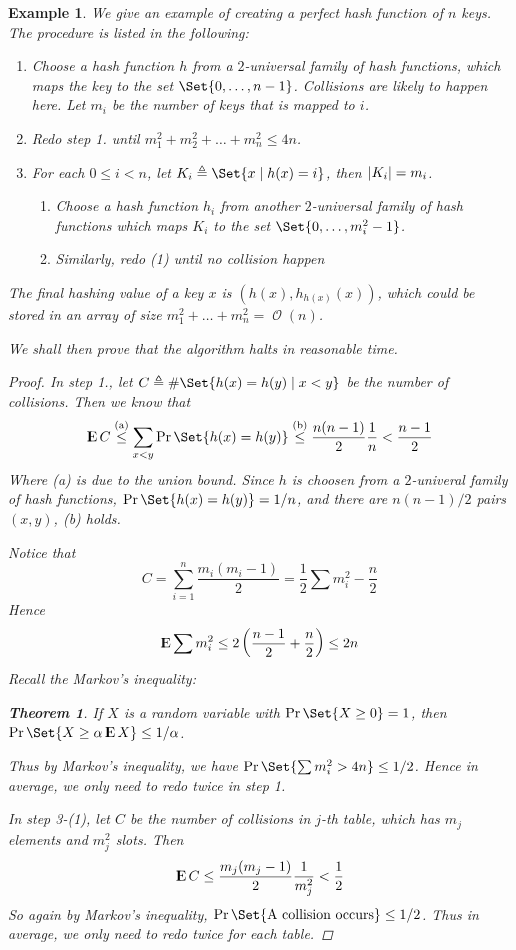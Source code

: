 \documentclass[12pt, a4paper]{article}
\DeclarePairedDelimiter{\abs}{\lvert}{\rvert}
\newcommand{\ord}{\operatorname{\mathcal{O}}}
\newcommand{\defeq}{\triangleq}
\DeclareMathOperator{\Expect}{{\rm I\kern-.3em E}}
\newtheorem{theorem}{Theorem}
\theoremstyle{mystyle} %
\newtheorem{example}{Example}
\begin{document}
\begin{example}
  We give an example of creating a perfect hash function of $n$ keys.
  The procedure is listed in the following:
  \begin{enumerate}
    \item Choose a hash function $h$ from a $2$-universal family of hash functions,
      which maps the key to the set $\Set{0, \dots, n-1}$. Collisions are
      likely to happen here. Let $m_i$ be the number of keys that is mapped to $i$.
    \item Redo step 1. until $m_1^2 + m_2^2 + \dots + m_n^2 \leq 4n$.
    \item For each $0 \leq i < n$, let $K_i \defeq \Set{ x \mid h(x) = i }$, then $\abs{K_i} = m_i$.
      \begin{enumerate}[label=(\arabic*)]
        \item Choose a hash function $h_i$ from another $2$-universal family of hash functions
          which maps $K_i$ to the set $\Set{0, \dots, m_i^2-1}$.
        \item Similarly, redo (1) until no collision happen
      \end{enumerate}
  \end{enumerate}

  The final hashing value of a key $x$ is $(h(x), h_{h(x)}(x))$, which
  could be stored in an array of size $m_1^2 + \dots + m_n^2 = \ord(n)$.

  We shall then prove that the algorithm halts in reasonable time.
  \begin{proof}
    In step 1., let $C \defeq \# \Set{ h(x) = h(y) \mid x < y}$ be the number of collisions.
    Then we know that
    \[ \Expect C \stackrel{\text{(a)}}{\leq}
      \sum_{x < y} \Pr \Set{ h(x) = h(y) }
      \stackrel{\text{(b)}}{\leq} \frac{n (n - 1)}{2} \frac{1}{n} < \frac{n-1}{2} \]
    Where (a) is due to the union bound. Since $h$ is choosen from a $2$-univeral family
    of hash functions, $\Pr \Set{ h(x) = h(y) } = 1/n$, and there are $n (n-1)/2$ pairs $(x, y)$,
    (b) holds.

    Notice that
    \[ C = \sum_{i = 1}^n \frac{m_i (m_i - 1)}{2} = \frac{1}{2} \sum m_i^2 - \frac{n}{2} \]
    Hence
    \[ \Expect \sum m_i^2 \leq 2 \left( \frac{n-1}{2} + \frac{n}{2} \right) \leq 2 n \]
    Recall the Markov's inequality:
    \begin{theorem}
      If $X$ is a random variable with $\Pr\Set{ X \geq 0 } = 1$, then $\Pr \Set{X \geq \alpha \Expect X}
      \leq 1 / \alpha$.
    \end{theorem}

    Thus by Markov's inequality, we have $\Pr\Set{ \sum m_i^2 > 4n } \leq 1 / 2$.
    Hence in average, we only need to redo twice in step 1.

    In step 3-(1), let $C$ be the number of collisions in $j$-th table,
    which has $m_j$ elements and $m_j^2$ slots.
    Then 
    \[ \Expect C \leq  \frac{m_j (m_j - 1)}{2} \frac{1}{m_j^2} < \frac{1}{2} \]
    So again by Markov's inequality, $\Pr\Set{ \text{A collision occurs} } \leq 1 / 2$.
    Thus in average, we only need to redo twice for each table.
  \end{proof}
\end{example}
\end{document}
